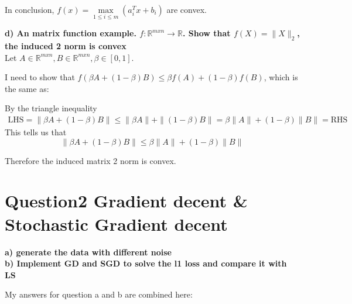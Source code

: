 \documentclass[paper=a4, fontsize=11pt]{scrartcl} %
\numberwithin{equation}{section} %
\numberwithin{figure}{section} %
\numberwithin{table}{section} %
\begin{document}
In conclusion, $f(x) = \underset{1 \leq i \leq m}{\max} (a_i^T x + b_i)$ are convex. 

\newpage
\textbf{d) An matrix function example. $f: \mathbb{R}^{mxn} \rightarrow \mathbb{R}$. Show that $f(X) = \|X\|_2$, the induced 2 norm is convex}\\


Let $A \in \mathbb{R}^{mxn}, B \in \mathbb{R}^{mxn}, \beta \in [0,1]$. 

I need to show that $f(\beta A + (1-\beta)B) \leq \beta f(A) + (1-\beta) f(B)$, which is the same as: 


By the triangle inequality 
\begin{align*}
\text{LHS} = \|\beta A + (1-\beta)B \| \leq \|\beta A \| + \| (1-\beta)B \| = \beta \|A\| + (1-\beta) \|B\| = \text{RHS}
\end{align*}
This tells us that 
$$ \|\beta A + (1-\beta)B \| \leq \beta \|A\| + (1-\beta) \|B\| $$

Therefore the induced matrix 2 norm is convex. 


\newpage
\section*{Question2 Gradient decent \& Stochastic Gradient decent}


\textbf{a) generate the data with different noise}\\
\textbf{b) Implement GD and SGD to solve the l1 loss and compare it with LS}

My answers for question a and b are combined here:
\end{document}
